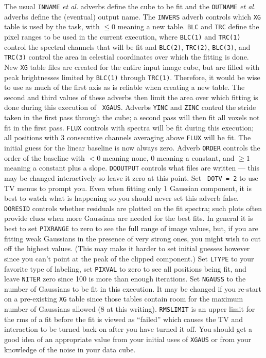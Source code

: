 \documentclass[twoside]{article}
\newcommand{\Me}[1]{\textcolor{mecol}{#1}}
\begin{document}
The usual {\tt INNAME} {\it et al.} adverbs define the cube to be fit
and the {\tt OUTNAME} {\it et al.} adverbs define the (eventual)
output name.  The {\tt INVERS} adverb controls which {\tt XG} table is
used by the task, with $\leq 0$ meaning a new table.  {\tt BLC} and
{\tt TRC} define the pixel ranges to be used in the current execution,
where {\tt BLC(1)} and {\tt TRC(1)} control the spectral channels that
will be fit and {\tt BLC(2)}, {\tt TRC(2)}, {\tt BLC(3)}, and {\tt
TRC(3)} control the area in celestial coordinates over which the
fitting is done.  \Me{New {\tt XG} table files are created for the
entire input image cube, but are filled with peak brightnesses limited
by {\tt BLC(1)} through {\tt TRC(1)}\@.  Therefore, it would be wise
to use as much of the first axis as is reliable when creating a new
table.  The second and third values of these adverbs then limit the
area over which fitting is done during this execution of {\tt
  XGAUS}\@.}  Adverbs {\tt YINC} and {\tt ZINC} control the stride
taken in the first pass through the cube; a second pass will then fit
all voxels not fit in the first pass.  {\tt FLUX} controls with
spectra will be fit during this execution; all positions with 3
consecutive channels averaging above {\tt FLUX} will be fit.  The
initial guess for the linear baseline \Me{is now always zero.  Adverb
  {\tt ORDER} controls the order of the baseline with $<0$ meaning
  none, 0 meaning a constant, and $\ge 1$ meaning a constant plus a
  slope.}  {\tt DOOUTPUT} controls what files are written --- this may
be changed interactively so leave it zero at this point.  Set {\tt
  DOTV = 2} to use TV menus to prompt you.  Even when fitting only 1
Gaussian component, it is best to watch what is happening so you
should never set this adverb false.  {\tt DORESID} controls whether
residuals are plotted on the fit spectra; such plots often provide
clues when more Gaussians are needed for the best fits.  In general it
is best to set {\tt PIXRANGE} to zero to see the full range of image
values, but, if you are fitting weak Gaussians in the presence of very
strong ones, you might wish to cut off the highest values.  (This may
make it harder to set initial guesses however since you can't point at
the peak of the clipped component.)  Set {\tt LTYPE} to your favorite
type of labeling, set {\tt PIXVAL} to zero to see all positions being
fit, and leave {\tt NITER} zero since 100 is more than enough
iterations. Set {\tt NGAUSS} to the number of Gaussians to be fit in
this execution.  It may be changed if you re-start on a pre-existing
{\tt XG} table since those tables contain room for the maximum number
of Gaussians allowed (8 at this writing).  {\tt RMSLIMIT} is an upper
limit for the rms of a fit before the fit is viewed as ``failed''
which causes the TV and interaction to be turned back on after you
have turned it off.  You should get a good idea of an appropriate
value from your initial uses of {\tt XGAUS} or from your knowledge of
the noise in your data cube.
\end{document}
